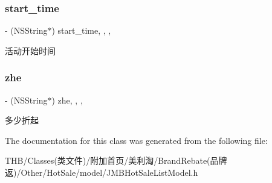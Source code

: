 \subsubsection{\texorpdfstring{start\+\_\+time}{start\_time}}
{\footnotesize\ttfamily -\/ (N\+S\+String$\ast$) start\+\_\+time\hspace{0.3cm}{\ttfamily [read]}, {\ttfamily [write]}, {\ttfamily [nonatomic]}, {\ttfamily [copy]}}

活动开始时间 \mbox{\label{interface_j_m_b_hot_sale_list_model_aadf7e9e266359c091e85bacf73d555ec}} 
\subsubsection{\texorpdfstring{zhe}{zhe}}
{\footnotesize\ttfamily -\/ (N\+S\+String$\ast$) zhe\hspace{0.3cm}{\ttfamily [read]}, {\ttfamily [write]}, {\ttfamily [nonatomic]}, {\ttfamily [copy]}}

多少折起 

The documentation for this class was generated from the following file\+:\begin{DoxyCompactItemize}
\item 
T\+H\+B/\+Classes(类文件)/附加首页/美利淘/\+Brand\+Rebate(品牌返)/\+Other/\+Hot\+Sale/model/J\+M\+B\+Hot\+Sale\+List\+Model.\+h\end{DoxyCompactItemize}
